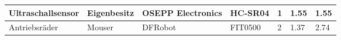 \documentclass[main.tex]{subfiles} %
\begin{document}
\begin{table}[h]
{\begin{tabular}{|p{3cm}|p{2.5cm}|p{2.5cm}|p{3cm}|p{1cm}|p{1.5cm}|p{1cm}|}
            Ultraschallsensor                       & Eigenbesitz        & OSEPP Electronics            & HC-SR04                 & 1               & 1.55                      & 1.55                           \\ \hline
            Antriebsräder                           & Mouser             & DFRobot                      & FIT0500                 & 2               & 1.37                      & 2.74                        \\ \hline

\end{tabular}}
\end{table}
\end{document}
